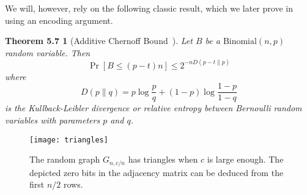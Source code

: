 We will, however, rely on the following classic result, which we later
prove in  using an encoding argument.
\newtheorem*{thm:chernoff}{Theorem 5.7}%
\begin{thm:chernoff}[Additive Chernoff Bound~\cite{mulzer:encoding}]
  Let $B$ be a $\text{Binomial}(n, p)$ random variable. Then
  \[
  \Pr[B \leq (p - t)n] \leq 2^{-n D(p - t \| p)}
  \]
  where
  \[D(p \| q) = p \log \frac{p}{q} + (1 - p) \log \frac{1 - p}{1 -
    q}\]
  is the \emph{Kullback-Leibler divergence} or \emph{relative entropy}
  between Bernoulli random variables with parameters $p$ and $q$.
\end{thm:chernoff}

\begin{figure}
  \centering
  \texttt{[image: triangles]}
  \caption{The random graph $G_{n, c/n}$ has triangles when $c$ is
    large enough. The depicted zero bits in the adjacency matrix can
    be deduced from the first $n/2$ rows.}
\end{figure}

